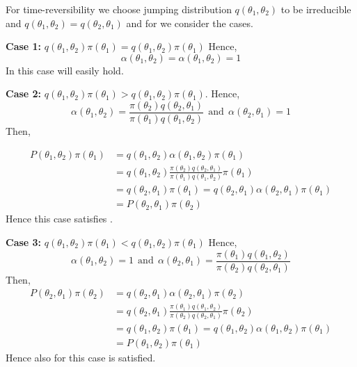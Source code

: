 For time-reversibility we choose jumping distribution $ q(\theta_1,\theta_2) $ to be irreducible and $ q(\theta_1,\theta_2) = q(\theta_2,\theta_1) $ and for  we consider the cases.

\textbf{Case 1:} $ q(\theta_1,\theta_2)\pi(\theta_1) = q(\theta_1,\theta_2)\pi(\theta_1)$
Hence, $$ \alpha(\theta_1,\theta_2) = \alpha(\theta_1,\theta_2) = 1 $$
In this case  will easily hold.

\textbf{Case 2:} $ q(\theta_1,\theta_2)\pi(\theta_1) > q(\theta_1,\theta_2)\pi(\theta_1)$.
Hence,
\[
	\alpha(\theta_1,\theta_2) = \frac{\pi(\theta_2)q(\theta_2,\theta_1)}{\pi(\theta_1)q(\theta_1,\theta_2)} \ \ \text{and} \ \ \alpha(\theta_2,\theta_1) = 1
\]
Then,

\begin{align*}
	P(\theta_1,\theta_2)\pi(\theta_1) & = q(\theta_1,\theta_2)\alpha(\theta_1,\theta_2) \pi(\theta_1)                                                    \\
	                                  & = q(\theta_1,\theta_2) \frac{\pi(\theta_2)q(\theta_2,\theta_1)}{\pi(\theta_1)q(\theta_1,\theta_2)} \pi(\theta_1) \\
	                                  & = q(\theta_2,\theta_1) \pi(\theta_1) = q(\theta_2,\theta_1) \alpha(\theta_2,\theta_1) \pi(\theta_1)              \\
	                                  & = P(\theta_2,\theta_1) \pi(\theta_2)
\end{align*}
Hence this case satisfies .

\textbf{Case 3:} $ q(\theta_1,\theta_2)\pi(\theta_1) < q(\theta_1,\theta_2)\pi(\theta_1)$
Hence,
\[
	\alpha(\theta_1,\theta_2) = 1  \ \ \text{and} \ \  \alpha(\theta_2,\theta_1) = \frac{\pi(\theta_1)q(\theta_1,\theta_2)}{\pi(\theta_2)q(\theta_2,\theta_1)}
\]
Then,
\begin{align*}
	P(\theta_2,\theta_1)\pi(\theta_2) & = q(\theta_2,\theta_1)\alpha(\theta_2,\theta_1)\pi(\theta_2)                                                     \\
	                                  & = q(\theta_2,\theta_1) \frac{\pi(\theta_1)q(\theta_1,\theta_2)}{\pi(\theta_2)q(\theta_2,\theta_1)} \pi(\theta_2) \\
	                                  & = q(\theta_1,\theta_2) \pi(\theta_1) = q(\theta_1,\theta_2) \alpha(\theta_1,\theta_2) \pi(\theta_1)              \\
	                                  & =P(\theta_1,\theta_2) \pi(\theta_1)
\end{align*}
Hence also for this case  is satisfied.

